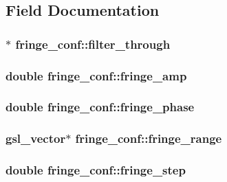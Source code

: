 \subsection{Field Documentation}
\hypertarget{structfringe__conf_abe82bcdcd21b328bb374df7b1af43153}{
\subsubsection[{filter\_\-through}]{$\ast$ {\bf fringe\_\-conf::filter\_\-through}}}
\label{structfringe__conf_abe82bcdcd21b328bb374df7b1af43153}
\hypertarget{structfringe__conf_a82769d872faed1af21769411078d76f5}{
\subsubsection[{fringe\_\-amp}]{\setlength{\rightskip}{0pt plus 5cm}double {\bf fringe\_\-conf::fringe\_\-amp}}}
\label{structfringe__conf_a82769d872faed1af21769411078d76f5}
\hypertarget{structfringe__conf_a063f94aa831f45434151fcd07e18a05d}{
\subsubsection[{fringe\_\-phase}]{\setlength{\rightskip}{0pt plus 5cm}double {\bf fringe\_\-conf::fringe\_\-phase}}}
\label{structfringe__conf_a063f94aa831f45434151fcd07e18a05d}
\hypertarget{structfringe__conf_aa96d6742b1e0009ca830907949e8875b}{
\subsubsection[{fringe\_\-range}]{\setlength{\rightskip}{0pt plus 5cm}gsl\_\-vector$\ast$ {\bf fringe\_\-conf::fringe\_\-range}}}
\label{structfringe__conf_aa96d6742b1e0009ca830907949e8875b}
\hypertarget{structfringe__conf_aa2e4fd8fec88650b18a12372ef85ba4b}{
\subsubsection[{fringe\_\-step}]{\setlength{\rightskip}{0pt plus 5cm}double {\bf fringe\_\-conf::fringe\_\-step}}}
